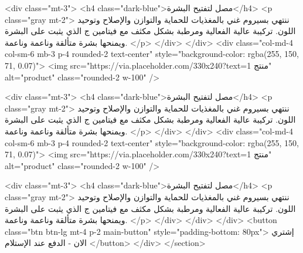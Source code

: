             <div class="mt-3">
              <h4 class="dark-blue">مصل لتفتيح البشرة</h4>
              <p class="gray mt-2">
                ننتهي بسيروم غني بالمغذيات للحماية والتوازن والإصلاح وتوحيد
                اللون. تركيبة عالية الفعالية ومرطبة بشكل مكثف مع فيتامين ج الذي
                يثبت على البشرة ويمنحها بشرة متألقة وناعمة وناعمة.
              </p>
            </div>
          </div>
          <div class="col-md-4 col-sm-6 mb-3 p-4 rounded-2 text-center"
            style="background-color: rgba(255, 150, 71, 0.07)">
            <img src="https://via.placeholder.com/330x240?text=منتج 1" alt="product" class="rounded-2 w-100" />

            <div class="mt-3">
              <h4 class="dark-blue">مصل لتفتيح البشرة</h4>
              <p class="gray mt-2">
                ننتهي بسيروم غني بالمغذيات للحماية والتوازن والإصلاح وتوحيد
                اللون. تركيبة عالية الفعالية ومرطبة بشكل مكثف مع فيتامين ج الذي
                يثبت على البشرة ويمنحها بشرة متألقة وناعمة وناعمة.
              </p>
            </div>
          </div>
          <div class="col-md-4 col-sm-6 mb-3 p-4 rounded-2 text-center"
            style="background-color: rgba(255, 150, 71, 0.07)">
            <img src="https://via.placeholder.com/330x240?text=منتج 1" alt="product" class="rounded-2 w-100" />

            <div class="mt-3">
              <h4 class="dark-blue">مصل لتفتيح البشرة</h4>
              <p class="gray mt-2">
                ننتهي بسيروم غني بالمغذيات للحماية والتوازن والإصلاح وتوحيد
                اللون. تركيبة عالية الفعالية ومرطبة بشكل مكثف مع فيتامين ج الذي
                يثبت على البشرة ويمنحها بشرة متألقة وناعمة وناعمة.
              </p>
            </div>
          </div>
        </div>
        <button class="btn btn-lg mt-4 p-2 main-button" style="padding-bottom: 80px">
          إشتري الان - الدفع عند الإستلام
        </button>
      </div>
    </section>

